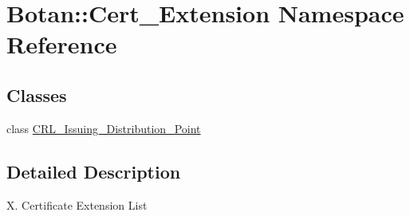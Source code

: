 \hypertarget{namespace_botan_1_1_cert___extension}{}\section{Botan\+:\+:Cert\+\_\+\+Extension Namespace Reference}
\label{namespace_botan_1_1_cert___extension}
\subsection*{Classes}
\begin{DoxyCompactItemize}
\item 
class \hyperlink{class_botan_1_1_cert___extension_1_1_c_r_l___issuing___distribution___point}{C\+R\+L\+\_\+\+Issuing\+\_\+\+Distribution\+\_\+\+Point}
\end{DoxyCompactItemize}


\subsection{Detailed Description}
X. Certificate Extension List 